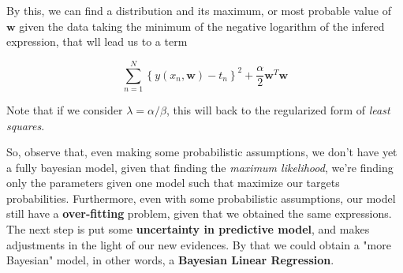 \begin{frame}{\insertsubsection}
By this, we can find a distribution and its maximum, or most probable value of $\mathbf{w}$ given the data taking the minimum of the negative logarithm of the infered expression, that wll lead us to a term

\begin{equation*}
\sum^N_{n=1} \left\{ y(x_n, \mathbf{w}) - t_n \right\}^2 + \frac{\alpha}{2} \mathbf{w}^T\mathbf{w}
\end{equation*}

Note that if we consider $\lambda = \alpha / \beta$, this will back to the regularized form of \textit{least squares}.
\end{frame}

\begin{frame}{\insertsubsection}

So, observe that, even making some probabilistic assumptions, we don't have yet a fully bayesian model, given that finding the \textit{maximum likelihood}, we're finding only the parameters given one model such that maximize our targets probabilities. Furthermore, even with some probabilistic assumptions, our model still have a \textbf{over-fitting} problem, given that we obtained the same expressions.\\
\vspace{1em}
The next step is put some \textbf{uncertainty in predictive model}, and makes adjustments in the light of our new evidences. By that we could obtain a "more Bayesian" model, in other words, a \textcolor{UniGold}{\textbf{Bayesian Linear Regression}}.

\end{frame}

%	

